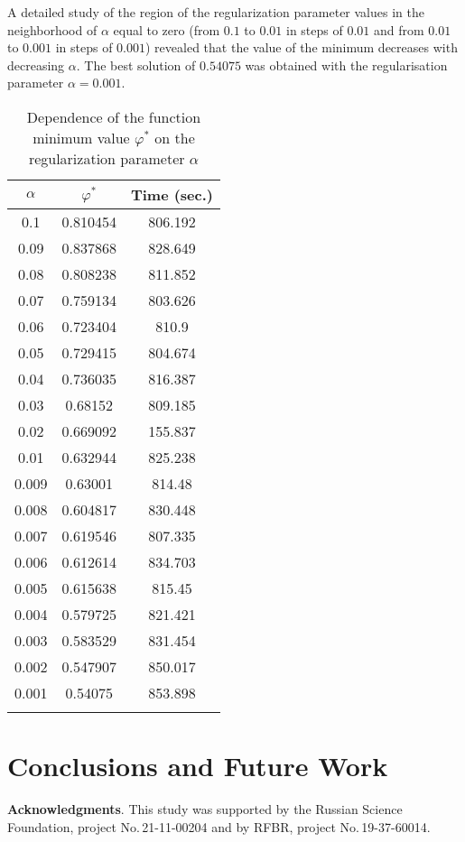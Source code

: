 \documentclass{svproc}
\begin{document}
A detailed study of the region of the regularization parameter values in the neighborhood of $\alpha$ equal to zero (from $0.1$ to $0.01$ in steps of $0.01$ and from $0.01$ to $0.001$ in steps of $0.001$) revealed that the value of the minimum decreases with decreasing $\alpha$. The best solution of $0.54075$ was obtained with the regularisation parameter $\alpha = 0.001$.


\begin{table}
\caption{Dependence of the function minimum value $\varphi^*$ on the regularization parameter $\alpha$}
\label{table_1}
\begin{center}
\begin{tabular}{ccc}
\hline\noalign{\smallskip}
 $\alpha$      & $\varphi^*$  & Time (sec.) \\
\hline\noalign{\smallskip}
0.1		&	0.810454	&	806.192	\\
0.09	&	0.837868	&	828.649 \\
0.08	&	0.808238	&	811.852	\\
0.07	&	0.759134	&	803.626 \\
0.06	&	0.723404	&	810.9		\\
0.05	&	0.729415	&	804.674	\\
0.04	&	0.736035	&	816.387	\\
0.03	&	0.68152		&	809.185	\\
0.02	&	0.669092	&	155.837	\\
0.01	&	0.632944	&	825.238	\\
0.009	&	0.63001		&	814.48	\\
0.008	&	0.604817	&	830.448	\\
0.007	&	0.619546	&	807.335	\\
0.006	&	0.612614	&	834.703	\\
0.005	&	0.615638	&	815.45	\\
0.004	&	0.579725	&	821.421	\\
0.003	&	0.583529	&	831.454	\\
0.002	&	0.547907	&	850.017	\\
0.001	&	0.54075		&	853.898	\\
\noalign{\smallskip}\hline
\end{tabular}\end{center}\end{table}



\section{Conclusions and Future Work}



\medskip

\textbf{Acknowledgments}. This study was supported by the Russian Science Foundation, project No.\,21-11-00204 and by RFBR, project No.\,19-37-60014.

%
%

{}
\end{document}
